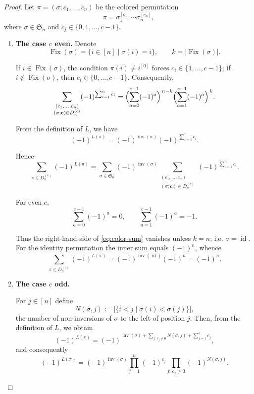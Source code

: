 \documentclass[a4paper,12pt]{article}
\begin{document}
\begin{proof}
Let $\pi = (\sigma;c_1,\dots,c_n)$ be the colored permutation
\[\pi=\sigma_1^{[c_1]}\cdots \sigma_n^{[c_n]},\]
where $\sigma\in \mathfrak{S}_n$ and $c_j\in\{0,1,\dots,c-1\}$.  

\medskip
\begin{enumerate}
\item \textbf{The case $c$ even.}
Denote
\[
\operatorname{Fix}(\sigma)=\{i\in[n]\mid \sigma(i)=i\},
\qquad
k=|\operatorname{Fix}(\sigma)|.
\]

If $i\in\operatorname{Fix}(\sigma)$, the condition $\pi(i)\neq i^{[0]}$ forces $c_i\in\{1,\dots,c-1\}$;  
if $i\notin\operatorname{Fix}(\sigma)$, then $c_i\in\{0,\dots,c-1\}$.  
Consequently,
\begin{equation}\label{eq:color-sum}
\sum_{\substack{(c_1,\dots,c_n)\\ (\sigma;\mathbf{c})\in D_n^{(c)}}}
(-1)^{\sum_{i=1}^n c_i}
=
\Bigl(\sum_{a=0}^{c-1}(-1)^a\Bigr)^{\,n-k}
\Bigl(\sum_{a=1}^{c-1}(-1)^a\Bigr)^{\,k}. 
\end{equation}

From the definition of $L$, we have
\[
(-1)^{L(\pi)}=(-1)^{\operatorname{inv}(\sigma)}(-1)^{\sum_{i=1}^n c_i}.
\]

Hence
\[
\sum_{\pi\in D_n^{(c)}}(-1)^{L(\pi)}
=
\sum_{\sigma\in\mathfrak{S}_n}(-1)^{\operatorname{inv}(\sigma)}
\sum_{\substack{(c_1,\dots,c_n)\\ (\sigma;\mathbf{c})\in D_n^{(c)}}}
(-1)^{\sum_{i=1}^n c_i}.
\]

For even $c$,
\[
\sum_{a=0}^{c-1}(-1)^a=0,\qquad
\sum_{a=1}^{c-1}(-1)^a=-1.
\]

Thus the right-hand side of \eqref{eq:color-sum} vanishes unless $k=n$; i.e. $\sigma=\operatorname{id}$.  
For the identity permutation the inner sum equals $(-1)^n$, whence
\[
\sum_{\pi\in D_n^{(c)}}(-1)^{L(\pi)}
=(-1)^{\operatorname{inv}(\operatorname{id})}(-1)^n=(-1)^n.
\]

\item \textbf{The case $c$ odd.}

For $j\in[n]$ define
\[
N(\sigma,j):=\bigl|\{i<j\mid \sigma(i)<\sigma(j)\}\bigr|,
\]
the number of non-inversions of $\sigma$ to the left of position $j$.  
Then, from the definition of $L$, we obtain
\[
(-1)^{L(\pi)}=(-1)^{\operatorname{inv}(\sigma)
+\sum_{j:\,c_j\neq 0}N(\sigma,j)
+\sum_{j=1}^{n}c_j},
\]
and consequently
\begin{equation}\label{eq:L-factor}
(-1)^{L(\pi)}
=
(-1)^{\operatorname{inv}(\sigma)}
\prod_{j=1}^{n}(-1)^{c_j}
\prod_{j:\,c_j\neq 0}(-1)^{N(\sigma,j)}.
\end{equation}


\end{enumerate}
\end{proof}
\end{document}
